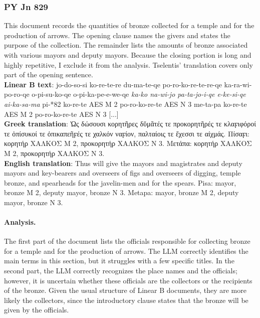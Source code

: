 \subsubsection{PY Jn 829}
This document records the quantities of bronze collected for a temple and for the production of arrows.
The opening clause names the givers and states the purpose of the collection.
The remainder lists the amounts of bronze associated with various mayors and deputy mayors.
Because the closing portion is long and highly repetitive, I exclude it from the analysis.
Tselentis' translation covers only part of the opening sentence. \\
\textbf{Linear B text}: jo-do-so-si ko-re-te-re du-ma-te-qe po-ro-ko-re-te-re-qe ka-ra-wi-po-ro-qe o-pi-su-ko-qe o-pi-ka-pe-e-we-qe \textit{ka-ko na-wi-jo pa-ta-jo-i-qe e-ke-si-qe ai-ka-sa-ma} pi-*82 ko-re-te AES M 2 po-ro-ko-re-te AES N 3 me-ta-pa ko-re-te AES M 2 po-ro-ko-re-te AES N 3 [...] \\
\textbf{Greek translation}: \textgreek{Ὡς δώσουσι κορητῆρες δῠμᾶτές τε προκορητῆρές τε κλαϝιφόροί τε ὀπίσυκοί τε ὀπικαπεῆϝές τε χαλκόν ναϝίον, παλταίοις τε ἔχεσσι τε αἰχμάς. Πίσαϝι: κορητήρ ΧΑΛΚΟΣ M 2, προκορητήρ ΧΑΛΚΟΣ N 3. Μετάπα: κορητήρ ΧΑΛΚΟΣ M 2, προκορητήρ ΧΑΛΚΟΣ N 3.} \\
\textbf{English translation}: Thus will give the mayors and magistrates and deputy mayors and key-bearers and overseers of figs and overseers of digging, temple bronze, and spearheads for the javelin-men and for the spears. Pisa: mayor, bronze M 2, deputy mayor, bronze N 3. Metapa: mayor, bronze M 2, deputy mayor, bronze N 3. 

\paragraph{Analysis.}
The first part of the document lists the officials responsible for collecting bronze for a temple and for the production of arrows.
The LLM correctly identifies the main terms in this section, but it struggles with a few specific titles.
In the second part, the LLM correctly recognizes the place names and the officials; however, it is uncertain whether these officials are the collectors or the recipients of the bronze.
Given the usual structure of Linear B documents, they are more likely the collectors, since the introductory clause states that the bronze will be given by the officials.


